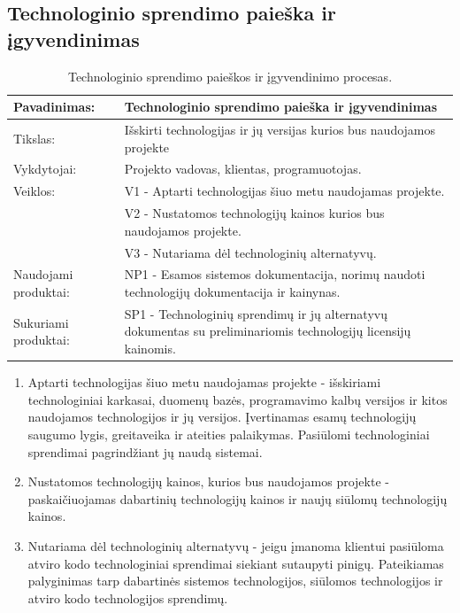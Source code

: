 \documentclass{VUMIFPSkursinis}
\begin{document}
	\subsection{Technologinio sprendimo paieška ir įgyvendinimas}

		\begin{center}
			\begin{table}[ht]
				\caption{Technologinio sprendimo paieškos ir įgyvendinimo procesas.}
					\begin{tabular}{ | l | l | } 
						\hline
							Pavadinimas:         & Technologinio sprendimo paieška ir įgyvendinimas                                      \\ \hline
							Tikslas: 	           & Išskirti technologijas ir jų versijas kurios bus naudojamos projekte 							\\ \hline
							Vykdytojai:          & Projekto vadovas, klientas, programuotojas.                             \\ \hline
							Veiklos:             & V1 - Aptarti technologijas šiuo metu naudojamas projekte. 													\\
											 & V2 - Nustatomos technologijų kainos kurios bus naudojamos projekte. \\
											 & V3 - Nutariama dėl technologinių alternatyvų.													\\ \hline
							Naudojami produktai: & NP1 - Esamos sistemos dokumentacija, norimų naudoti technologijų dokumentacija ir kainynas. 													 \\ \hline
							Sukuriami produktai: & SP1 - Technologinių sprendimų ir jų alternatyvų dokumentas su preliminariomis technologijų licensijų kainomis. 								\\ \hline
\end{tabular}
\end{table}
\end{center}

\begin{enumerate}
	\item{Aptarti technologijas šiuo metu naudojamas projekte - išskiriami technologiniai karkasai, duomenų bazės, programavimo kalbų versijos ir kitos naudojamos technologijos ir jų versijos.
	Įvertinamas esamų technologijų saugumo lygis, greitaveika ir ateities palaikymas. 
	Pasiūlomi technologiniai sprendimai pagrindžiant jų naudą sistemai.}
	\item{Nustatomos technologijų kainos, kurios bus naudojamos projekte - paskaičiuojamas dabartinių technologijų kainos ir naujų siūlomų technologijų kainos.}
	\item{Nutariama dėl technologinių alternatyvų - jeigu įmanoma klientui pasiūloma atviro kodo technologiniai sprendimai siekiant sutaupyti pinigų. 
		Pateikiamas palyginimas tarp dabartinės sistemos technologijos, siūlomos technologijos ir atviro kodo technologijos sprendimų. }
\end{enumerate}
	
\end{document}
